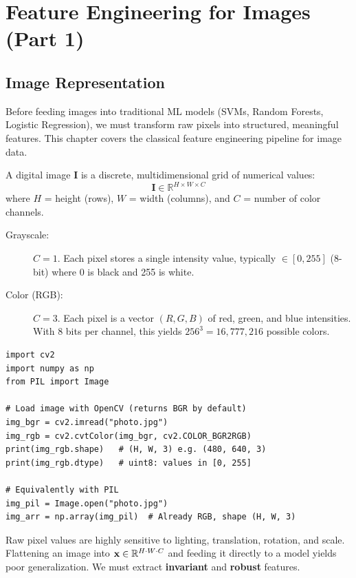 \chapter*{Feature Engineering for Images (Part 1)}

\section*{Image Representation}

Before feeding images into traditional ML models (SVMs, Random Forests, Logistic Regression), we must transform raw pixels into structured, meaningful features. This chapter covers the classical feature engineering pipeline for image data.

\begin{definition}
A digital image $\mathbf{I}$ is a discrete, multidimensional grid of numerical values:
$$ \mathbf{I} \in \mathbb{R}^{H \times W \times C} $$
where $H$ = height (rows), $W$ = width (columns), and $C$ = number of color channels.
\end{definition}

\begin{description}
    \item[Grayscale:] $C = 1$. Each pixel stores a single intensity value, typically $\in [0, 255]$ (8-bit) where 0 is black and 255 is white.
    \item[Color (RGB):] $C = 3$. Each pixel is a vector $(R, G, B)$ of red, green, and blue intensities. With 8 bits per channel, this yields $256^3 = 16{,}777{,}216$ possible colors.
\end{description}

\begin{lstlisting}[style=pythonstyle]
import cv2
import numpy as np
from PIL import Image

# Load image with OpenCV (returns BGR by default)
img_bgr = cv2.imread("photo.jpg")
img_rgb = cv2.cvtColor(img_bgr, cv2.COLOR_BGR2RGB)
print(img_rgb.shape)   # (H, W, 3) e.g. (480, 640, 3)
print(img_rgb.dtype)   # uint8: values in [0, 255]

# Equivalently with PIL
img_pil = Image.open("photo.jpg")
img_arr = np.array(img_pil)  # Already RGB, shape (H, W, 3)
\end{lstlisting}

\begin{remark}
Raw pixel values are highly sensitive to lighting, translation, rotation, and scale. Flattening an image into $\mathbf{x} \in \mathbb{R}^{H \cdot W \cdot C}$ and feeding it directly to a model yields poor generalization. We must extract \textbf{invariant} and \textbf{robust} features.
\end{remark}

